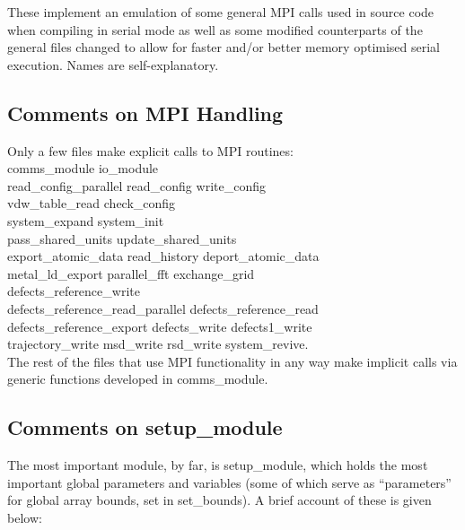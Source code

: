 These implement an emulation of some general MPI calls used in \D
source code when compiling in serial mode as well as some modified
counterparts of the general files changed to allow for faster and/or
better memory optimised serial execution.  Names are
self-explanatory.

\subsection{Comments on MPI Handling}

Only a few files make explicit calls to MPI routines: \\
{\sc
comms\_module io\_module \\
read\_config\_parallel read\_config write\_config \\
vdw\_table\_read check\_config \\
system\_expand system\_init \\
pass\_shared\_units update\_shared\_units \\
export\_atomic\_data read\_history deport\_atomic\_data \\
metal\_ld\_export parallel\_fft exchange\_grid \\
defects\_reference\_write \\
defects\_reference\_read\_parallel defects\_reference\_read \\
defects\_reference\_export defects\_write defects1\_write \\
trajectory\_write msd\_write rsd\_write system\_revive}. \\
The rest of the files that use MPI functionality in any way make
implicit calls via generic functions developed in {\sc comms\_module}.

\subsection{Comments on {\sc setup\_module}}
\label{parameters}

The most important module, by far, is {\sc setup\_module}, which
holds the most important global parameters and variables (some of
which serve as ``parameters'' for global array bounds, set in {\sc
set\_bounds}). A brief account of these is given below:

